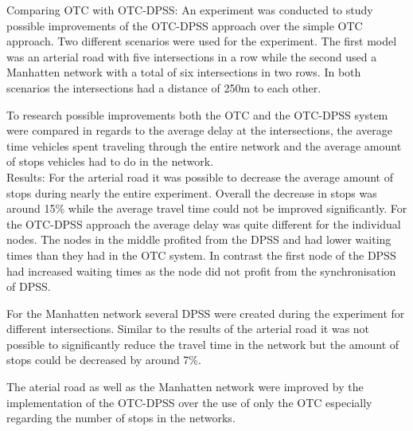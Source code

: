 Comparing OTC with OTC-DPSS: An experiment was conducted to study possible improvements of the OTC-DPSS approach over the simple OTC approach. Two different scenarios were used for the experiment. The first model was an arterial road with five intersections in a row while the second used a Manhatten network with a total of six intersections in two rows. In both scenarios the intersections had a distance of 250m to each other.

To research possible improvements both the OTC and the OTC-DPSS system were compared in regards to the average delay at the intersections, the average time vehicles spent traveling through the entire network and the average amount of stops vehicles had to do in the network.\cite{organic1}\ \\

Results: For the arterial road it was possible to decrease the average amount of stops during nearly the entire experiment. Overall the decrease in stops was around 15\% while the average travel time could not be improved significantly. For the OTC-DPSS approach the average delay was quite different for the individual nodes. The nodes in the middle profited from the DPSS and had lower waiting times than they had in the OTC system. In contrast the first node of the DPSS had increased waiting times as the node did not profit from the synchronisation of DPSS.

For the Manhatten network several DPSS were created during the experiment for different intersections. Similar to the results of the arterial road it was not possible to significantly reduce the travel time in the network but the amount of stops could be decreased by around 7\%.\cite{organic1}

The aterial road as well as the Manhatten network were improved by the implementation of the OTC-DPSS over the use of only the OTC especially regarding the number of stops in the networks.

